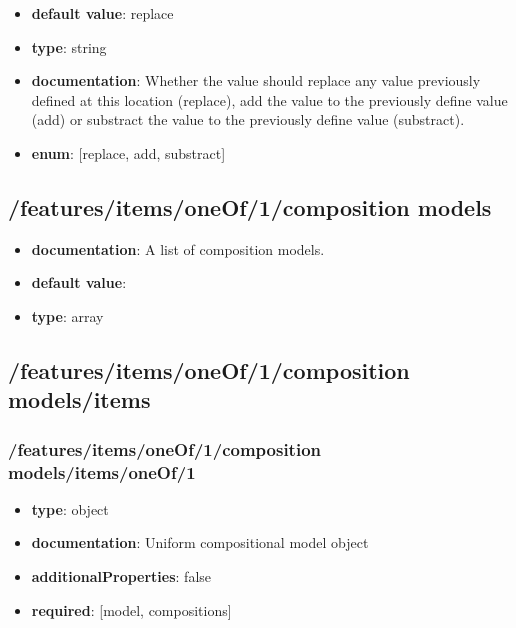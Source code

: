 \begin{itemize}\item {\bf default value}: replace
\item {\bf type}: string
\item {\bf documentation}: Whether the value should replace any value previously defined at this location (replace), add the value to the previously define value (add) or substract the value to the previously define value (substract).
\item {\bf enum}: [replace, add, substract]\end{itemize}\subsection{/features/items/oneOf/1/composition models}
\begin{itemize}\item {\bf documentation}: A list of composition models.
\item {\bf default value}: 
\item {\bf type}: array
\end{itemize}\subsection{/features/items/oneOf/1/composition models/items}

\subsubsection{/features/items/oneOf/1/composition models/items/oneOf/1}
\begin{itemize}\item {\bf type}: object
\item {\bf documentation}: Uniform compositional model object
\item {\bf additionalProperties}: false
\item {\bf required}: [model, compositions]\end{itemize}
